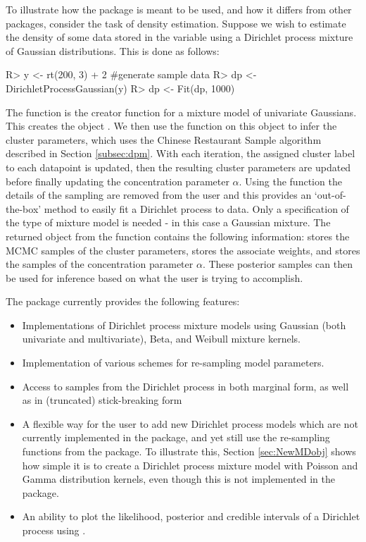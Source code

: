 \documentclass[nojss]{jss}
\begin{document}
To illustrate how the package is meant to be used, and how it differs from other  packages, consider the task of density estimation. Suppose we wish to estimate the density of some data stored in the variable  using a Dirichlet process mixture of Gaussian distributions. This is done as follows:

\begin{Schunk}
\begin{Sinput}
R> y <- rt(200, 3) + 2 #generate sample data
R> dp <- DirichletProcessGaussian(y)
R> dp <- Fit(dp, 1000)
\end{Sinput}
\end{Schunk}

The function  is the creator function for a mixture model of univariate Gaussians. This creates the object . We then use the function  on this object to infer the cluster parameters, which uses the Chinese Restaurant Sample algorithm described in Section \ref{subsec:dpm}. With each iteration, the assigned cluster label to each datapoint is updated, then the resulting cluster parameters are updated before finally updating the concentration parameter $\alpha$. Using the  function the details of the sampling are removed from the user and this provides an `out-of-the-box' method to easily fit a Dirichlet process to data. Only a specification of the type of mixture model is needed - in this case a Gaussian mixture. The returned object  from the  function contains the following information:  stores the MCMC samples of the cluster parameters,  stores the associate weights, and  stores the samples of the concentration parameter $\alpha$. These posterior samples can then be used for inference based on what the user is trying to accomplish.

The  package currently provides the following features:

\begin{itemize}
\item Implementations of Dirichlet process mixture models using Gaussian (both univariate and multivariate), Beta, and Weibull mixture kernels.
\item Implementation of various schemes for re-sampling model parameters.
\item Access to samples from the Dirichlet process in both marginal form, as well as in (truncated) stick-breaking form
\item A flexible way for the user to add new Dirichlet process models which are not currently implemented in the package, and yet still use the re-sampling functions from the package. To illustrate this, Section \ref{sec:NewMDobj} shows how simple it is to create a Dirichlet process mixture model with Poisson and Gamma distribution kernels, even though this is not implemented in the package.
\item An ability to plot the likelihood, posterior and credible intervals of a Dirichlet process using .
\end{itemize}
\end{document}
